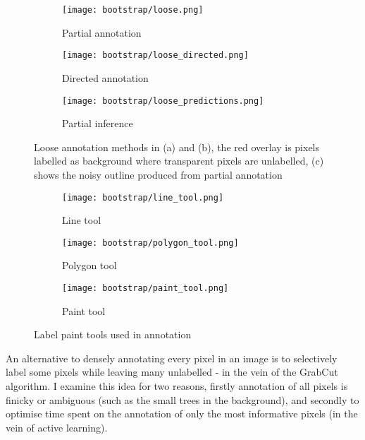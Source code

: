 \begin{figure}[!ht]
\centering
\begin{subfigure}[t]{.33\textwidth}
  \centering
  \texttt{[image: bootstrap/loose.png]}
  \caption{Partial annotation}
  \label{fig:bootstrap_loose_annot}
\end{subfigure}%
\begin{subfigure}[t]{.33\textwidth}
  \centering
  \texttt{[image: bootstrap/loose\_directed.png]}
  \caption{Directed annotation}
  \label{fig:bootstrap_loose_dir}

\end{subfigure}%
\begin{subfigure}[t]{.33\textwidth}
  \centering
  \texttt{[image: bootstrap/loose\_predictions.png]}
  \caption{Partial inference}
  \label{fig:bootstrap_loose_pred}
\end{subfigure}
  \caption{Loose annotation methods in (a) and (b), the red overlay is pixels labelled as background where transparent pixels are unlabelled, (c) shows the  noisy outline produced from partial annotation }


\end{figure}

\begin{figure}
\centering
\begin{subfigure}[t]{.33\textwidth}
  \centering
  \texttt{[image: bootstrap/line\_tool.png]}
  \caption{Line tool}
\end{subfigure}%
\begin{subfigure}[t]{.33\textwidth}
  \centering
  \texttt{[image: bootstrap/polygon\_tool.png]}
  \caption{Polygon tool}
\end{subfigure}%
\begin{subfigure}[t]{.33\textwidth}
  \centering
  \texttt{[image: bootstrap/paint\_tool.png]}
  \caption{Paint tool}
\end{subfigure}%

  \caption{Label paint tools used in annotation}
  \label{fig:bootstrap_tools}

\end{figure}



An alternative to densely annotating every pixel in an image is to selectively label some pixels while leaving many unlabelled - in the vein of the GrabCut algorithm. I examine this idea for two reasons, firstly annotation of all pixels is finicky or ambiguous (such as the small trees in the background), and secondly to optimise time spent on the annotation of only the most informative pixels (in the vein of active learning).

